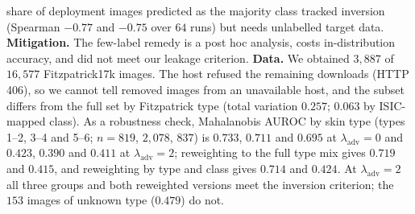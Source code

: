 \documentclass{midl}
\newcommand{\lam}{\lambda_{\mathrm{adv}}}
\begin{document}
share of deployment images predicted as the majority class tracked inversion
(Spearman $-0.77$ and $-0.75$ over $64$ runs) but needs unlabelled target data. \textbf{Mitigation.} The few-label
remedy is a post hoc analysis, costs in-distribution accuracy, and did not meet our leakage
criterion. \textbf{Data.} We obtained $3{,}887$ of $16{,}577$ Fitzpatrick17k images. The host refused
the remaining downloads (HTTP 406), so we cannot tell removed images from an unavailable host, and the
subset differs from the full set by Fitzpatrick type (total variation $0.257$; $0.063$ by ISIC-mapped
class). As a robustness check, Mahalanobis AUROC by skin type (types 1--2, 3--4 and 5--6; $n=819$,
$2{,}078$, $837$) is $0.733$, $0.711$ and $0.695$ at $\lam=0$ and $0.423$, $0.390$ and $0.411$ at $\lam=2$;
reweighting to the full type mix gives $0.719$ and $0.415$, and reweighting by type and class gives
$0.714$ and $0.424$. At $\lam=2$ all three groups and both reweighted versions meet the inversion
criterion; the $153$ images of unknown type ($0.479$) do not.

\FloatBarrier
\end{document}
